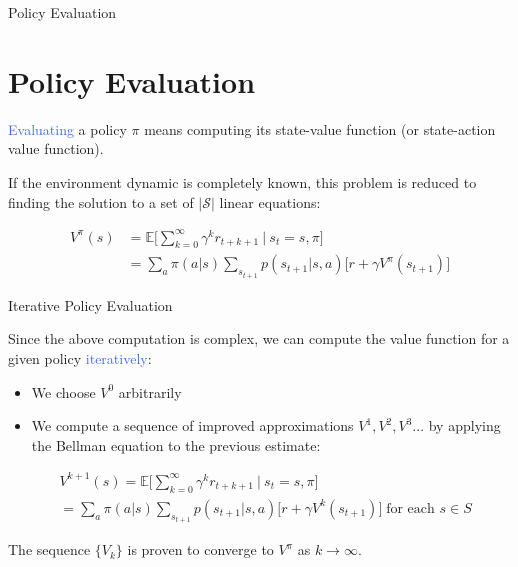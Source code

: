 \documentclass{beamer}
\begin{document}
\begin{frame}{Policy Evaluation}
\section{Policy Evaluation}

\textcolor{RoyalBlue}{Evaluating} a policy $\pi$ means computing its state-value function (or state-action value function).

\vspace{2mm}

If the environment dynamic is completely known, this problem is reduced to finding the solution to a set of $\mathcal{|S|}$ linear equations:



\begin{align*}
    V^{\pi}(s)& = \mathds{E} \bigg[\sum_{k=0}^{\infty}\gamma^{k} r_{t+k+1} \: \bigg| \: s_t=s,\pi \bigg] \\
		   & = \sum_a \pi(a|s) \sum_{s_{t+1}} p(s_{t+1}|s,a)\big[r + \gamma V^{\pi}({s_{t+1}}) \big] 
\end{align*}

\end{frame}


\begin{frame}{Iterative Policy Evaluation}

Since the above computation is complex, we can compute the value function for a given policy \textcolor{RoyalBlue}{iteratively}:
\begin{itemize}
    \item We choose $V^0$ arbitrarily
    \item We compute a sequence of improved approximations $V^1, V^2, V^3 ...$  by applying the Bellman equation to the previous estimate:
\end{itemize}

\begin{align*}
    &V^{k+1}(s) = \mathds{E} \bigg[\sum_{k=0}^{\infty}\gamma^{k} r_{t+k+1} \: \bigg| \: s_t=s,\pi \bigg] \\
		   & = \sum_a \pi(a|s) \sum_{s_{t+1}} p(s_{t+1}|s,a)\big[r + \gamma V^{k}(s_{t+1}) \big] \; \text{for each } s \in S
\end{align*}

The sequence $\{V_k\}$ is proven to converge to $V^{\pi}$ as $k \rightarrow \infty $.

\end{frame}
\end{document}
